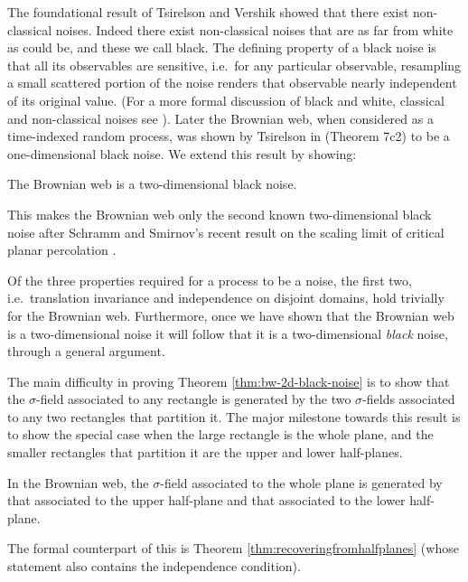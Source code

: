 {The foundational result of Tsirelson and Vershik \cite{tsirelson-vershik} showed that there
exist non-classical noises.  Indeed there exist non-classical noises
that are as far from white as could be, and these we call black.  The
defining property of a black noise is that all its observables are
sensitive, i.e.\ for any particular observable, resampling
a small scattered portion of the noise
renders that observable nearly independent of its original
value.  (For a more formal discussion of black and white, classical
and non-classical noises see \cite{tsirelson-nonclassical-stochastic-flows}).
Later the Brownian web,
when considered as a time-indexed random process,
was shown by Tsirelson in
\cite{tsirelson-scaling-limit-noise-stability} (Theorem 7c2)
to be a one-dimensional black noise.  We
extend this
result by showing:

\begin{theorem}
\label{thm:bw-2d-black-noise}
The Brownian web is a
two-dimensional black noise.
\end{theorem}

This makes the Brownian web only the second
known two-dimensional black noise after Schramm and Smirnov's
recent result on the scaling limit of critical planar
percolation \cite{schramm-smirnov}.

Of the three properties required for a process to be a noise, the
first two, i.e.\ translation invariance and independence on disjoint
domains, hold trivially for the Brownian web.  Furthermore, once we
have shown that the Brownian web is a two-dimensional noise it will
follow that it is a two-dimensional \emph{black} noise,
through a general argument.

The main difficulty in proving
Theorem \ref{thm:bw-2d-black-noise} is to show that the $\sigma$-field
associated to any rectangle is generated by the two $\sigma$-fields
associated to any two rectangles that partition it.
The major milestone towards this result is to show the special case
when the large rectangle is the whole plane, and the smaller
rectangles that partition it are the upper and lower half-planes.

\begin{theorem}
\label{thm:informal-recovering-from-half-planes}
In the Brownian web, the $\sigma$-field associated to the whole plane
is generated by that associated to the upper half-plane and that
associated to the lower half-plane.
\end{theorem}

The formal counterpart of this is
Theorem \ref{thm:recoveringfromhalfplanes} (whose statement also
contains the independence condition).

}

